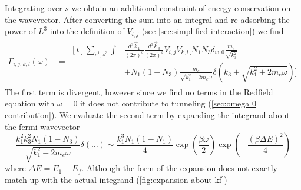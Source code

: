 Integrating over \(s\) we obtain
an additional constraint of energy
conservation on the
wavevector. After
converting the sum into
an integral and re-adsorbing
the power of \(L^3\) into the
definition of \(V_{i,j}\)
(see \cref{sec:simplified interaction})
we find
\begin{align}
    \Gamma_{i,j, k,l}(\omega) & =\begin{aligned}[t]
        \sum_{s^1,s^3} \int &
        \frac{d^3\vec{k}_1}{{(2\pi)}^3}
        \frac{d^3\vec{k}_3}{{(2\pi)}^3}
        V_{i,j} V_{k,l} [
        N_1 N_3 \delta_{w, 0} \frac{m_e}{\sqrt{k_3^2}} \\
                            & + N_1 (1 - N_3)
                \frac{m_e}{\sqrt{k_1^2 - 2m_e\omega}}
                \delta({k_3 \pm \sqrt{k_1^2 + 2m_e\omega}}) ]
    \end{aligned}\label{eqn:gamma integral form}
\end{align}
The first term is divergent, however
since we find no terms in the Redfield
equation with \(\omega = 0\)
it does not contribute to tunneling
(\cref{sec:omega 0 contribution}).
We evaluate the second term
by expanding the integrand about the fermi
wavevector
\begin{equation}
    \frac{k_1 ^ 2 k_3 ^ 2 N_1 (1 - N_3)}
    {\sqrt{k_1^2 - 2m_e\omega}}
    \delta(\dots)
    \sim
    \frac{k_1 ^ 3 N_1 (1 - N_1)}{4}
    \exp{(\frac{\beta \omega}{2})}
    \exp{(-\frac{{(\beta \Delta E)}^2}{4})}
\end{equation}
where \(\Delta E = E_1 - E_f\).
Although the form of the
expansion does not exactly
match up with the actual
integrand (\cref{fig:expansion about kf})
